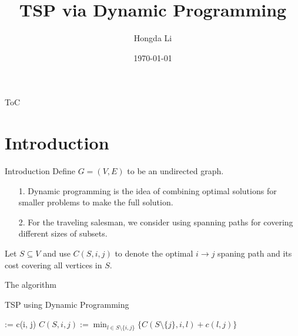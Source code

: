 \documentclass[11pt]{beamer}
\author{Hongda Li}
\title{TSP via Dynamic Programming}
\institute[]{UBCO}
\date{\today}
\begin{document}
\begin{frame}
    \titlepage
\end{frame}

\begin{frame}{ToC}
    \tableofcontents
\end{frame}

\section{Introduction}
    \begin{frame}{Introduction}
        Define $G=(V, E)$ to be an undirected graph. 
        \begin{itemize}
            \item [1.] Dynamic programming is the idea of combining optimal solutions for smaller problems to make the full solution. 
            \item [2.] For the traveling salesman, we consider using spanning paths for covering different sizes of subsets. 
        \end{itemize}
        \begin{definition}
            Let $S\subseteq V$ and use $C(S, i, j)$ to denote the optimal $i\rightarrow j$ spaning path and its cost covering all vertices in $S$. 
        \end{definition}
    \end{frame}
    \begin{frame}{The algorithm}
        \begin{block}{TSP using Dynamic Programming}
            \begin{algorithm}[H]
                \caption{Held Karp algorithm for Travelling Salesman}\label{alg:dtsp}
                \begin{algorithmic}
                    {
                         := c(i, j)
                    }
                    \ENDFOR
                    {
                        {
                            {
                                \STATE
                                {$C(S, i, j) := \min_{l\in S\setminus \{i, j\}} \{
                                    C(S\setminus \{j\}, i, l) + c(l, j)
                                \}$
                                }
                            }
                            \ENDFOR
                        }
                        \ENDFOR
                    }
                    \ENDFOR
                \end{algorithmic}
            \end{algorithm}    
        \end{block}
    \end{frame}
\end{document}
